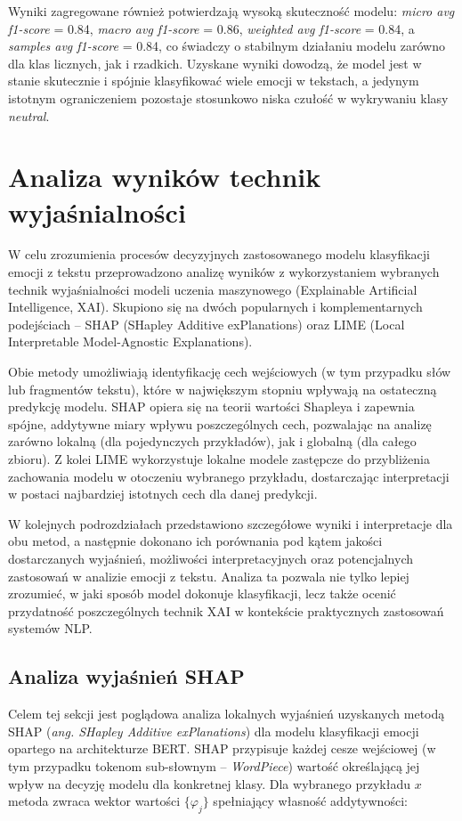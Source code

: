 \documentclass[wmii, inf, mgr]{uwmthesis}
\begin{document}
Wyniki zagregowane również potwierdzają wysoką skuteczność modelu: \textit{micro avg f1-score} = 0.84, \textit{macro avg f1-score} = 0.86, \textit{weighted avg f1-score} = 0.84, a \textit{samples avg f1-score} = 0.84, co świadczy o stabilnym działaniu modelu zarówno dla klas licznych, jak i rzadkich. Uzyskane wyniki dowodzą, że model jest w stanie skutecznie i spójnie klasyfikować wiele emocji w tekstach, a jedynym istotnym ograniczeniem pozostaje stosunkowo niska czułość w wykrywaniu klasy \textit{neutral}.


\section{Analiza wyników technik wyjaśnialności}
W celu zrozumienia procesów decyzyjnych zastosowanego modelu klasyfikacji emocji z tekstu przeprowadzono analizę wyników z wykorzystaniem wybranych technik wyjaśnialności modeli uczenia maszynowego (Explainable Artificial Intelligence, XAI). Skupiono się na dwóch popularnych i komplementarnych podejściach -- SHAP (SHapley Additive exPlanations) oraz LIME (Local Interpretable Model-Agnostic Explanations).

Obie metody umożliwiają identyfikację cech wejściowych (w tym przypadku słów lub fragmentów tekstu), które w największym stopniu wpływają na ostateczną predykcję modelu. SHAP opiera się na teorii wartości Shapleya i zapewnia spójne, addytywne miary wpływu poszczególnych cech, pozwalając na analizę zarówno lokalną (dla pojedynczych przykładów), jak i globalną (dla całego zbioru). Z kolei LIME wykorzystuje lokalne modele zastępcze do przybliżenia zachowania modelu w otoczeniu wybranego przykładu, dostarczając interpretacji w postaci najbardziej istotnych cech dla danej predykcji.

W kolejnych podrozdziałach przedstawiono szczegółowe wyniki i interpretacje dla obu metod, a następnie dokonano ich porównania pod kątem jakości dostarczanych wyjaśnień, możliwości interpretacyjnych oraz potencjalnych zastosowań w analizie emocji z tekstu. Analiza ta pozwala nie tylko lepiej zrozumieć, w jaki sposób model dokonuje klasyfikacji, lecz także ocenić przydatność poszczególnych technik XAI w kontekście praktycznych zastosowań systemów NLP.


\subsection{Analiza wyjaśnień SHAP}
Celem tej sekcji jest poglądowa analiza lokalnych wyjaśnień uzyskanych metodą SHAP (\textit{ang. SHapley Additive exPlanations}) dla modelu klasyfikacji emocji opartego na architekturze BERT. SHAP przypisuje każdej cesze wejściowej (w tym przypadku tokenom sub-słownym -- \textit{WordPiece}) wartość określającą jej wpływ na decyzję modelu dla konkretnej klasy. Dla wybranego przykładu \(x\) metoda zwraca wektor wartości \(\{\varphi_j\}\) spełniający własność addytywności:
\end{document}
